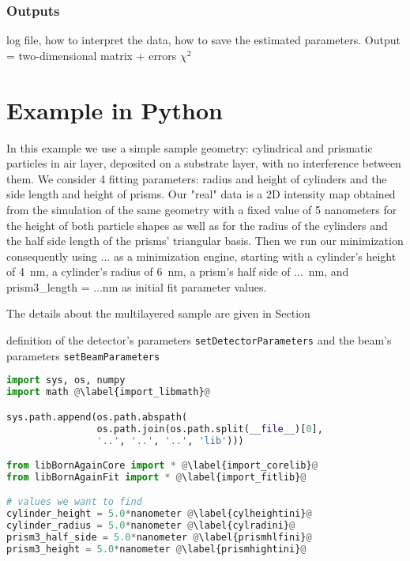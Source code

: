\subsubsection{Outputs}
log file, how to interpret the data, how to save the estimated parameters.
Output = two-dimensional matrix + errors $\chi^2$

\section{Example in Python}

In this example we use a simple sample geometry: cylindrical and
prismatic particles
in air layer, deposited on a substrate layer, with no interference
between them. We consider 4 fitting parameters: radius and height of cylinders and the
side length and height of prisms.  Our "real" data is a 2D intensity
map obtained from the simulation of the same geometry with a fixed
value of 5 nanometers for the height of both particle shapes as well
as for the radius of the cylinders and the half side length of the
prisms' triangular basis. Then we run our minimization consequently
using ... as a  minimization engine, starting with a cylinder's height
of 4~nm, a cylinder's radius of 6~nm, a prism's half side of ...~nm,
and prism3\_length = ...nm as initial fit parameter values.

The details about the multilayered sample are given in Section%

 definition of the detector's
  parameters \texttt{setDetectorParameters} and the beam's parameters
  \texttt{setBeamParameters}


\begin{lstlisting}[language=python, style=eclipseboxed, name=exfit,nolol]
import sys, os, numpy 
import math @\label{import_libmath}@

sys.path.append(os.path.abspath(
                os.path.join(os.path.split(__file__)[0],
                '..', '..', '..', 'lib')))

from libBornAgainCore import * @\label{import_corelib}@
from libBornAgainFit import * @\label{import_fitlib}@

# values we want to find
cylinder_height = 5.0*nanometer @\label{cylheightini}@
cylinder_radius = 5.0*nanometer @\label{cylradini}@
prism3_half_side = 5.0*nanometer @\label{prismhlfini}@
prism3_height = 5.0*nanometer @\label{prismhightini}@
\end{lstlisting}

